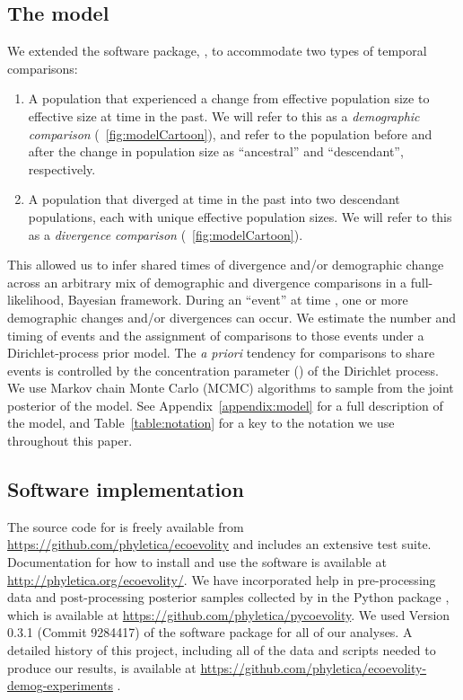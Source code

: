 % 
\subsection{The model}

We extended the software package, \ecoevolity, to accommodate two types of
temporal comparisons:
\begin{enumerate}
    \item A population that experienced a change from effective population size
        \epopsize[\rootpopindex]
        to effective size
        \epopsize[\descendantpopindex{}]
        at time \comparisonetime in the past.
        We will refer to this as a \emph{demographic comparison}
        (\fig{}~\ref{fig:modelCartoon}),
        and refer to the population before and after the change in population
        size as ``ancestral'' and ``descendant'', respectively.
    \item A population that diverged at time \comparisonetime in the past into
        two descendant populations, each with unique effective population
        sizes.
        We will refer to this as a \emph{divergence comparison}
        (\fig{}~\ref{fig:modelCartoon}).
\end{enumerate}
This allowed us to infer shared times of divergence and/or demographic change
across an arbitrary mix of demographic and divergence comparisons in a
full-likelihood, Bayesian framework.
During an ``event'' at time \etime, one or more demographic changes and/or
divergences can occur.
We estimate the number and timing of events and the assignment of comparisons
to those events under a Dirichlet-process \citep{Ferguson1973,Antoniak1974}
prior model.
The \emph{a priori} tendency for comparisons to share events is controlled by
the concentration parameter (\concentration) of the Dirichlet process.
We use Markov chain Monte Carlo (MCMC) algorithms
\citep{Metropolis1953,Hastings1970,Neal2000}
to sample from the joint posterior of the model.
See Appendix~\ref{appendix:model} for a full description of the model, and
Table~\ref{table:notation} for a key to the notation we use throughout this
paper.

\subsection{Software implementation}
The \cpp source code for \ecoevolity is freely available from
\url{https://github.com/phyletica/ecoevolity} and includes an extensive test
suite.
Documentation for how to install and use the software is available at
\url{http://phyletica.org/ecoevolity/}.
We have incorporated help in pre-processing data and post-processing posterior
samples collected by \ecoevolity in the Python package \pycoevolity, which is
available at
\url{https://github.com/phyletica/pycoevolity}.
We used Version 0.3.1
(Commit 9284417)
of the \ecoevolity software package for all of our analyses.
A detailed history of this project, including all of the data and scripts
needed to produce our results, is available at
\url{https://github.com/phyletica/ecoevolity-demog-experiments}
\citep{Oaks2019CodemogZenodo}.


